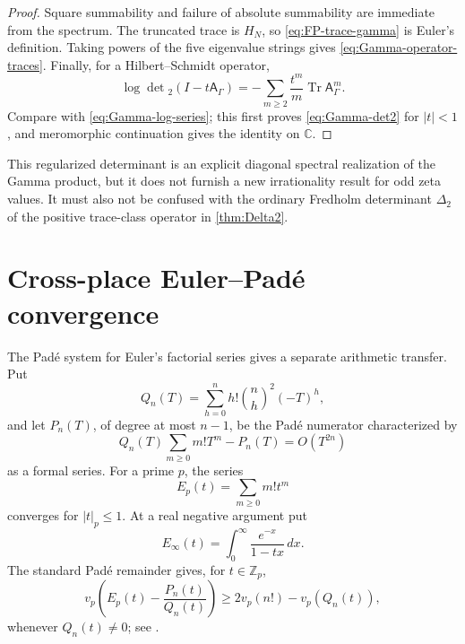 \documentclass[11pt]{article}
\theoremstyle{definition}
\theoremstyle{remark}
\newcommand{\C}{\mathbb C}
\newcommand{\Z}{\mathbb Z}
\newcommand{\Tr}{\operatorname{Tr}}
\begin{document}
\begin{proof}
Square summability and failure of absolute summability are immediate from
the spectrum.  The truncated trace is \(H_N\), so
\eqref{eq:FP-trace-gamma} is Euler's definition.  Taking powers of the five
eigenvalue strings gives \eqref{eq:Gamma-operator-traces}.  Finally, for a
Hilbert--Schmidt operator,
\[
 \log\det{}_2(I-t\mathsf A_\Gamma)
 =-\sum_{m\ge2}\frac{t^m}{m}\Tr\mathsf A_\Gamma^m.
\]
Compare with \eqref{eq:Gamma-log-series}; this first proves
\eqref{eq:Gamma-det2} for \(|t|<1\), and meromorphic continuation gives the
identity on \(\C\).
\end{proof}

This regularized determinant is an explicit diagonal spectral realization of the
Gamma product, but it does not furnish a new irrationality result for odd
zeta values.  It must also not be confused with the ordinary Fredholm
determinant \(\Delta_2\) of the positive trace-class operator in
\cref{thm:Delta2}.

\section{Cross-place Euler--Pad\'e convergence}
\label{sec:cross-place-pade}

The Pad\'e system for Euler's factorial series gives a separate arithmetic
transfer.  Put
\begin{equation}\label{eq:Euler-Pade-Q}
 Q_n(T)=\sum_{h=0}^nh!\binom nh^2(-T)^h,
\end{equation}
and let \(P_n(T)\), of degree at most \(n-1\), be the Pad\'e numerator
characterized by
\begin{equation}\label{eq:Euler-Pade-condition}
 Q_n(T)\sum_{m\ge0}m!T^m-P_n(T)=O(T^{2n})
\end{equation}
as a formal series.  For a prime \(p\), the series
\begin{equation}\label{eq:p-adic-Euler-series}
 E_p(t)=\sum_{m\ge0}m!t^m
\end{equation}
converges for \(|t|_p\le1\).  At a real negative argument put
\begin{equation}\label{eq:real-Euler-function}
 E_\infty(t)=\int_0^\infty\frac{e^{-x}}{1-tx}\,dx.
\end{equation}
The standard Pad\'e remainder gives, for \(t\in\Z_p\),
\begin{equation}\label{eq:p-adic-remainder-bound}
 v_p\!\left(E_p(t)-\frac{P_n(t)}{Q_n(t)}\right)
 \ge2v_p(n!)-v_p(Q_n(t)),
\end{equation}
whenever \(Q_n(t)\ne0\); see
\cite{ErnvallMatalaSeppala2022}.
\end{document}
